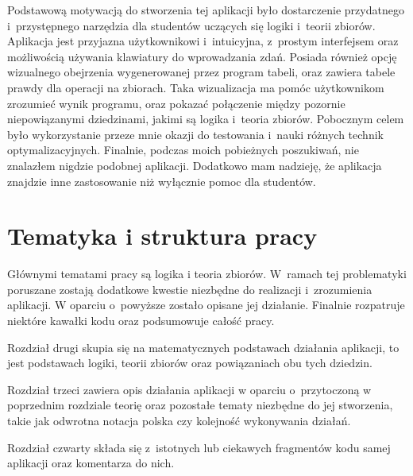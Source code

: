 \documentclass{SGGW-thesis}
\begin{document}
\begin{paragraph}{}
    Podstawową motywacją do stworzenia tej aplikacji było dostarczenie przydatnego i~przystępnego narzędzia dla studentów uczących się logiki i~teorii zbiorów. Aplikacja jest przyjazna użytkownikowi i~intuicyjna, z~prostym interfejsem oraz możliwością używania klawiatury do wprowadzania zdań. Posiada również opcję wizualnego obejrzenia wygenerowanej przez program tabeli, oraz zawiera tabele prawdy dla operacji na zbiorach. Taka wizualizacja ma pomóc użytkownikom zrozumieć wynik programu, oraz pokazać połączenie między pozornie niepowiązanymi dziedzinami, jakimi są logika i~teoria zbiorów. Pobocznym celem było wykorzystanie przeze mnie okazji do testowania i~nauki różnych technik optymalizacyjnych. Finalnie, podczas moich pobieżnych poszukiwań, nie znalazłem nigdzie podobnej aplikacji. Dodatkowo mam nadzieję, że aplikacja znajdzie inne zastosowanie niż wyłącznie pomoc dla studentów.
\end{paragraph}
\newpage

\section{Tematyka i struktura pracy}

\begin{paragraph}{}
    Głównymi tematami pracy są logika i teoria zbiorów. W~ramach tej problematyki poruszane zostają dodatkowe kwestie niezbędne do realizacji i~zrozumienia aplikacji. W oparciu o~powyższe  zostało opisane jej działanie. Finalnie rozpatruje niektóre kawałki kodu oraz podsumowuje całość pracy.
\end{paragraph}

\begin{paragraph}{}
    Rozdział drugi skupia się na matematycznych podstawach działania aplikacji, to jest podstawach logiki, teorii zbiorów oraz powiązaniach obu tych dziedzin.
\end{paragraph}

\begin{paragraph}{}
    Rozdział trzeci zawiera opis działania aplikacji w oparciu o~przytoczoną w poprzednim rozdziale teorię oraz pozostałe tematy niezbędne do jej stworzenia, takie jak odwrotna notacja polska czy kolejność wykonywania działań.
\end{paragraph}

\begin{paragraph}{}
    Rozdział czwarty składa się z~istotnych lub ciekawych fragmentów kodu samej aplikacji oraz komentarza do nich.
\end{paragraph}
\end{document}
